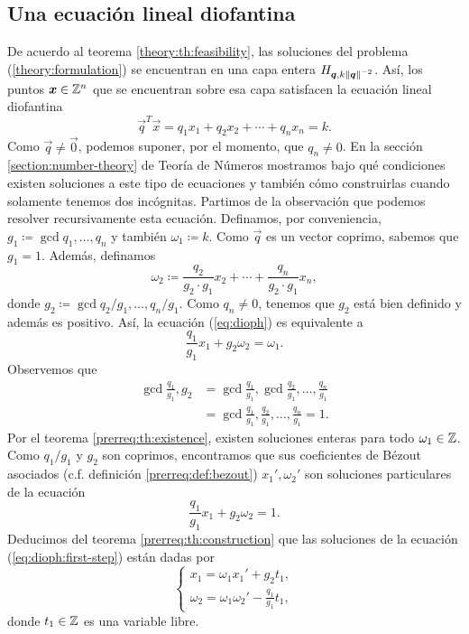 \subsection{Una ecuación lineal diofantina}
\label{subsec:dioph-eq}
\noindent
De acuerdo al teorema \ref{theory:th:feasibility}, las soluciones del problema
(\ref{theory:formulation}) se encuentran en una capa entera $H_{\boldsymbol{q}, k\left\lVert \boldsymbol{q} \right\rVert^{-2}}$.
Así, los puntos $\boldsymbol{x} \in \mathbb{Z}^n$ que se encuentran sobre esa capa satisfacen la ecuación lineal
diofantina
\begin{equation}
	\label{eq:dioph}
	\vec{q}^T\vec{x} = q_1x_1 + q_2x_2 + \cdots + q_nx_n = k.
\end{equation}
Como $\vec{q} \neq \vec{0}$, podemos suponer, por el momento, que $q_n \neq 0$. En la sección
\ref{section:number-theory} de Teoría de Números mostramos bajo qué condiciones existen soluciones a
este tipo de ecuaciones y también cómo construirlas cuando solamente tenemos dos incógnitas.
Partimos de la observación que podemos resolver recursivamente esta ecuación. Definamos, por
conveniencia, $g_1 \coloneq \gcd{q_1, \ldots, q_n}$ y también $\omega_1 \coloneq k$. Como $\vec{q}$
es un vector coprimo, sabemos que $g_1 = 1$. Además, definamos
\begin{equation*}
	\omega_2 \coloneq \frac{q_2}{g_2 \cdot g_1}x_2 + \cdots + \frac{q_n}{g_2 \cdot
	g_1}x_n,
\end{equation*}
donde $g_2 \coloneq \gcd{q_2/g_1, \ldots, q_n/g_1}$. Como $q_n \neq 0$, tenemos que $g_2$ está bien
definido y además es positivo. Así, la ecuación (\ref{eq:dioph}) es equivalente a
\begin{equation}
	\label{eq:dioph:first-step}
	\frac{q_1}{g_1}x_1 + g_2\omega_2 = \omega_1.
\end{equation}
Observemos que
\begin{align*}
	\gcd{\frac{q_1}{g_1}, g_2}
	&= \gcd{\frac{q_1}{g_1}, \gcd{\frac{q_2}{g_1}, \ldots, \frac{q_n}{g_1}}} \\
	&= \gcd{\frac{q_1}{g_1}, \frac{q_2}{g_1}, \ldots, \frac{q_n}{g_1}} = 1.
\end{align*}
Por el teorema \ref{prerreq:th:existence}, existen soluciones enteras para todo $\omega_1 \in \mathbb{Z}$.
Como $q_1/g_1$ y $g_2$ son coprimos, encontramos que sus coeficientes de Bézout asociados (c.f.
definición \ref{prerreq:def:bezout}) $x_1', \omega_2'$ son soluciones particulares de la ecuación
\begin{equation*}
	\frac{q_1}{g_1}x_1 + g_2\omega_2 = 1.
\end{equation*}
Deducimos del teorema \ref{prerreq:th:construction} que las soluciones de la ecuación
(\ref{eq:dioph:first-step}) están dadas por
\begin{equation}
	\label{dummy:eq:first-step}
	\begin{cases}
		x_1 = \omega_1x_1' + g_2t_1, \\
		\omega_2 = \omega_1\omega_2' - \frac{q_1}{g_1}t_1,
	\end{cases}
\end{equation}
donde $t_1 \in \mathbb{Z}$ es una variable libre.

